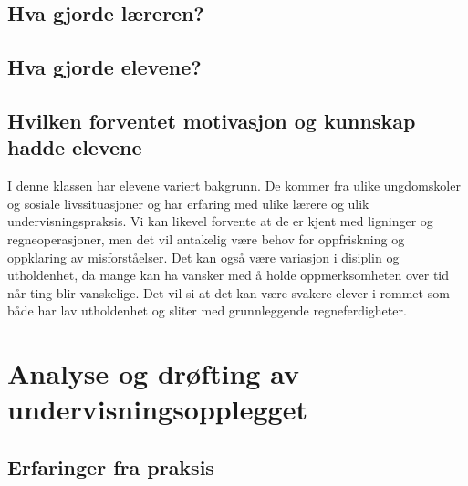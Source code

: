 \documentclass[12pt,a4paper]{article}
\begin{document}


    

\subsection*{Hva gjorde læreren?}%
\label{sub:hva_gjore_laereren}



\subsection*{Hva gjorde elevene?}%
\label{sub:hva_gjorde_elevene}



\subsection*{Hvilken forventet motivasjon og kunnskap hadde elevene}%
\label{sub:elevenes_forutsetninger}

I denne klassen har elevene variert bakgrunn. De kommer fra ulike
  ungdomskoler og sosiale livssituasjoner og har erfaring med ulike lærere og ulik
  undervisningspraksis. Vi kan likevel forvente at de er kjent med ligninger og
regneoperasjoner, men det vil antakelig være behov for oppfriskning og oppklaring av misforståelser.
Det kan også være variasjon i disiplin og utholdenhet, da mange kan ha vansker med å holde
oppmerksomheten over tid når ting blir vanskelige. Det vil si at det kan
være svakere elever i rommet som både har lav utholdenhet og sliter med grunnleggende regneferdigheter.

 



\section{Analyse og drøfting av undervisningsopplegget}
\label{sec:analyse}

\subsection{Erfaringer fra praksis}
\end{document}
